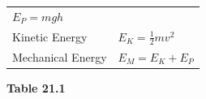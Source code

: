{{\begin{center}
\begin{xtabular}[t]{|l|l|}
                \begin{math}{E}_{P}=mgh\end{math}
     \tabularnewline{}
    
    
        Kinetic Energy &
    
    
        
                \begin{math}{E}_{K}=\frac{1}{2}m{v}^{2}\end{math}
     \tabularnewline{}
    
    
        Mechanical Energy &
    
    
        
                \begin{math}{E}_{M}={E}_{K}+{E}_{P}\end{math}
     \tabularnewline{}
    \end{xtabular}
      \end{center}
    \begin{center}{\small\bfseries Table 21.1}\end{center}
    
    \addtocounter{footnote}{-0}
    
}}
